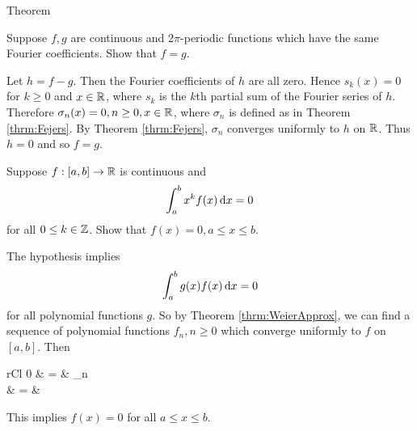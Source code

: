 \begin{section}{\fejers Theorem}

\begin{ex}
	Suppose $f,g$ are continuous and $2\pi$-periodic functions
	which have the same Fourier coefficients. Show that $f = g$.
\end{ex}

\begin{soln}
	Let $h = f-g$. Then the Fourier coefficients of $h$ are all zero.
	Hence $s_k(x) = 0$ for $k \geq 0$ and ${x} \in \mathbb{R}$, where $s_k$ is
	the $k$th partial sum of the Fourier series of $h$. Therefore
	$\sigma_n(x) = 0, n \geq 0, {x} \in \mathbb{R}$, where $\sigma_n$ is defined
	as in Theorem \ref{thrm:Fejers}. By Theorem \ref{thrm:Fejers},
	$\sigma_n$ converges uniformly to $h$ on $\mathbb{R}$. Thus $h=0$ and
	so $f=g$.
\end{soln}


\begin{ex}
	Suppose $f:[a,b] \rightarrow \mathbb{R}$ is continuous
	and
		\begin{displaymath}
			\int_{a}^{b}{x^k f(x)}\, \mathrm{d}{x} = 0
		\end{displaymath}
	for all $0 \leq k \in \mathbb{Z}$. Show that $f(x) = 0,
	a \leq x \leq b$.
\end{ex}

\begin{soln}
	The hypothesis implies
		\begin{displaymath}
			\int_{a}^{b}{g(x)f(x)}\, \mathrm{d}{x} = 0
		\end{displaymath}
	for all polynomial functions $g$. So by
	Theorem \ref{thrm:WeierApprox}, we can find
	a sequence of polynomial functions $f_n, n \geq 0$
	which converge uniformly to $f$ on $[a,b]$.
	Then
		\begin{IEEEeqnarray*}{rCl}
			0 & = & \lim_{n \rightarrow \infty}
				 \\
			& = & 
		\end{IEEEeqnarray*}
	This implies $f(x) = 0$ for all $a \leq x \leq b$.
\end{soln}



\end{section}
